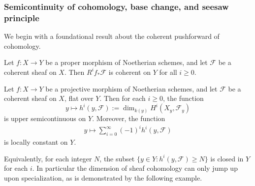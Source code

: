 \documentclass[12pt]{article}
\begin{document}
\subsubsection{Semicontinuity of cohomology, base change, and seesaw principle}
We begin with a foundational result about the coherent pushforward of cohomology.

\begin{theorem}
    Let $f : X \to Y$ be a proper morphism of Noetherian schemes, and let $\mathcal{F}$ be a coherent sheaf on $X$. Then $R^i f_* \mathcal{F}$ is coherent on $Y$ for all $i \geq 0$.
\end{theorem}

\begin{theorem}[Semicontinuity]\label{thm:semicontinuity}
    Let $f:X \to Y$ be a projective morphism of Noetherian schemes, and let
    $\mathcal F$ be a coherent sheaf on $X$, flat over $Y$. Then for each $i \ge 0$, the function
    \[
        y \longmapsto h^i(y,\mathcal F)
        := \dim_{k(y)} H^i(X_y,\mathcal F_y)
    \]
    is upper semicontinuous on $Y$. Moreover, the function \begin{align*}
        y \longmapsto \sum_{i=0}^\infty (-1)^i h^i(y,\mathcal F)
    \end{align*} is locally constant on $Y$.
\end{theorem}
Equivalently, for each integer $N$, the subset $\{y \in Y : h^i(y,\mathcal F) \geq N\}$ is closed in $Y$ for each $i$.
In particular the dimension of sheaf cohomology can only jump up upon specialization, as is demonstrated by the following example.
\end{document}

